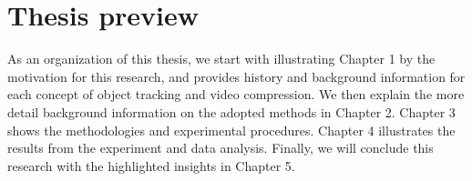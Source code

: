 \section{Thesis preview}
\label{sec:introduction/thesis_preview}

As an organization of this thesis, we start with illustrating Chapter 1 by the motivation for this research, and provides history and background information for each concept of object tracking and video compression. We then explain the more detail background information on the adopted methods in Chapter 2. Chapter 3 shows the methodologies and experimental procedures. Chapter 4 illustrates the results from the experiment and data analysis. Finally, we will conclude this research with the highlighted insights in Chapter 5.